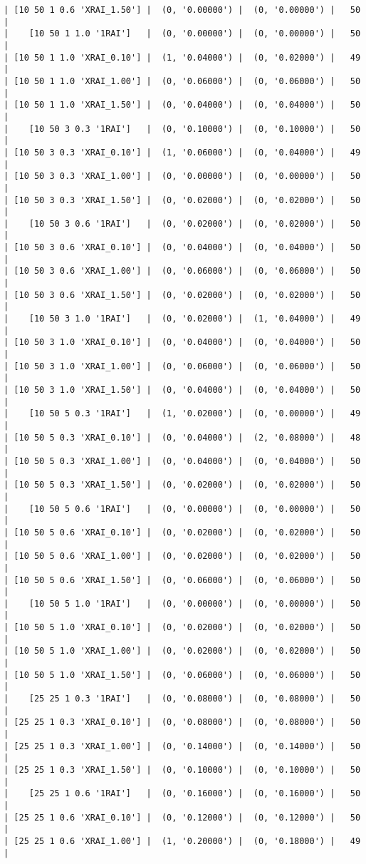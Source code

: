 \documentclass{article}
\begin{document}
\begin{verbatim}
| [10 50 1 0.6 'XRAI_1.50'] |  (0, '0.00000') |  (0, '0.00000') |   50  |
|    [10 50 1 1.0 '1RAI']   |  (0, '0.00000') |  (0, '0.00000') |   50  |
| [10 50 1 1.0 'XRAI_0.10'] |  (1, '0.04000') |  (0, '0.02000') |   49  |
| [10 50 1 1.0 'XRAI_1.00'] |  (0, '0.06000') |  (0, '0.06000') |   50  |
| [10 50 1 1.0 'XRAI_1.50'] |  (0, '0.04000') |  (0, '0.04000') |   50  |
|    [10 50 3 0.3 '1RAI']   |  (0, '0.10000') |  (0, '0.10000') |   50  |
| [10 50 3 0.3 'XRAI_0.10'] |  (1, '0.06000') |  (0, '0.04000') |   49  |
| [10 50 3 0.3 'XRAI_1.00'] |  (0, '0.00000') |  (0, '0.00000') |   50  |
| [10 50 3 0.3 'XRAI_1.50'] |  (0, '0.02000') |  (0, '0.02000') |   50  |
|    [10 50 3 0.6 '1RAI']   |  (0, '0.02000') |  (0, '0.02000') |   50  |
| [10 50 3 0.6 'XRAI_0.10'] |  (0, '0.04000') |  (0, '0.04000') |   50  |
| [10 50 3 0.6 'XRAI_1.00'] |  (0, '0.06000') |  (0, '0.06000') |   50  |
| [10 50 3 0.6 'XRAI_1.50'] |  (0, '0.02000') |  (0, '0.02000') |   50  |
|    [10 50 3 1.0 '1RAI']   |  (0, '0.02000') |  (1, '0.04000') |   49  |
| [10 50 3 1.0 'XRAI_0.10'] |  (0, '0.04000') |  (0, '0.04000') |   50  |
| [10 50 3 1.0 'XRAI_1.00'] |  (0, '0.06000') |  (0, '0.06000') |   50  |
| [10 50 3 1.0 'XRAI_1.50'] |  (0, '0.04000') |  (0, '0.04000') |   50  |
|    [10 50 5 0.3 '1RAI']   |  (1, '0.02000') |  (0, '0.00000') |   49  |
| [10 50 5 0.3 'XRAI_0.10'] |  (0, '0.04000') |  (2, '0.08000') |   48  |
| [10 50 5 0.3 'XRAI_1.00'] |  (0, '0.04000') |  (0, '0.04000') |   50  |
| [10 50 5 0.3 'XRAI_1.50'] |  (0, '0.02000') |  (0, '0.02000') |   50  |
|    [10 50 5 0.6 '1RAI']   |  (0, '0.00000') |  (0, '0.00000') |   50  |
| [10 50 5 0.6 'XRAI_0.10'] |  (0, '0.02000') |  (0, '0.02000') |   50  |
| [10 50 5 0.6 'XRAI_1.00'] |  (0, '0.02000') |  (0, '0.02000') |   50  |
| [10 50 5 0.6 'XRAI_1.50'] |  (0, '0.06000') |  (0, '0.06000') |   50  |
|    [10 50 5 1.0 '1RAI']   |  (0, '0.00000') |  (0, '0.00000') |   50  |
| [10 50 5 1.0 'XRAI_0.10'] |  (0, '0.02000') |  (0, '0.02000') |   50  |
| [10 50 5 1.0 'XRAI_1.00'] |  (0, '0.02000') |  (0, '0.02000') |   50  |
| [10 50 5 1.0 'XRAI_1.50'] |  (0, '0.06000') |  (0, '0.06000') |   50  |
|    [25 25 1 0.3 '1RAI']   |  (0, '0.08000') |  (0, '0.08000') |   50  |
| [25 25 1 0.3 'XRAI_0.10'] |  (0, '0.08000') |  (0, '0.08000') |   50  |
| [25 25 1 0.3 'XRAI_1.00'] |  (0, '0.14000') |  (0, '0.14000') |   50  |
| [25 25 1 0.3 'XRAI_1.50'] |  (0, '0.10000') |  (0, '0.10000') |   50  |
|    [25 25 1 0.6 '1RAI']   |  (0, '0.16000') |  (0, '0.16000') |   50  |
| [25 25 1 0.6 'XRAI_0.10'] |  (0, '0.12000') |  (0, '0.12000') |   50  |
| [25 25 1 0.6 'XRAI_1.00'] |  (1, '0.20000') |  (0, '0.18000') |   49  |

\end{verbatim}
\end{document}
